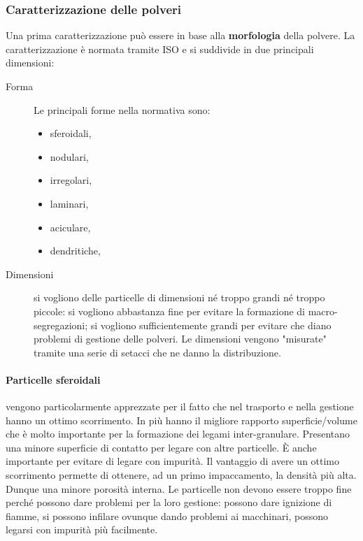 \subsubsection{Caratterizzazione delle polveri}
Una prima caratterizzazione può essere in base alla \textbf{morfologia} della polvere.
La caratterizzazione è normata tramite ISO e si suddivide in due principali dimensioni:
\begin{description}
\item[Forma] Le principali forme nella normativa sono:
	\begin{itemize}
	\item sferoidali,
	\item nodulari,
	\item irregolari,
	\item laminari,
	\item aciculare,
	\item dendritiche,
	\end{itemize}
\item[Dimensioni] si vogliono delle particelle di dimensioni né troppo grandi né troppo piccole: si vogliono abbastanza fine per evitare la formazione di macro-segregazioni; si vogliono sufficientemente grandi per evitare che diano problemi di gestione delle polveri.
Le dimensioni vengono "misurate" tramite una serie di setacci che ne danno la distribuzione.
\end{description}

\paragraph{Particelle sferoidali} vengono particolarmente apprezzate per il fatto che nel trasporto e nella gestione hanno un ottimo scorrimento. In più hanno il migliore rapporto superficie/volume che è molto importante per la formazione dei legami inter-granulare.
Presentano una minore superficie di contatto per legare con altre particelle. È anche importante per evitare di legare con impurità.
Il vantaggio di avere un ottimo scorrimento permette di ottenere, ad un primo impaccamento, la densità più alta. Dunque una minore porosità interna.
Le particelle non devono essere troppo fine perché possono dare problemi per la loro gestione: possono dare ignizione di fiamme, si possono infilare ovunque dando problemi ai macchinari, possono legarsi con impurità più facilmente.

